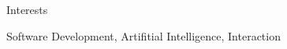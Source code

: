 
\begin{rubric}{Interests}

	\in{}
	Software Development, Artifitial Intelligence, Interaction
	
\end{rubric}
